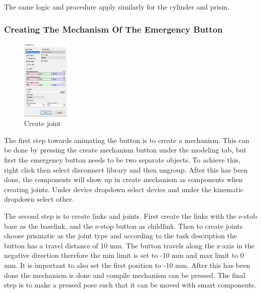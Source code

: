 \documentclass[a4paper,12pt]{article}
\begin{document}
The same logic and procedure apply similarly for the cylinder and prism.

\subsubsection{Creating The Mechanism Of The Emergency Button}
\begin{figure}
  \label{fig:create_joint}
  \centering
  \includegraphics[width=0.2\textwidth]{create_joint.png}
  \caption{Create joint}
\end{figure}
The first step towards animating the button is to create a mechanism. This can be done by pressing the create mechanism button under the modeling tab, but first the emergency button needs to be two separate objects. To achieve this, right click then select disconnect library and then ungroup. After this has been done, the components will show up in create mechanism as components when creating joints. Under device dropdown select device and under the kinematic dropdown select other.

The second step is to create links and joints. First create the links with the e-stob base as the baselink, and the e-stop button as childlink. Then to create joints choose prismatic as the joint type and according to the task description the button has a travel distance of 10 mm. The button travels along the z-axis in the negative direction therefore the min limit is set to -10 mm and max limit to 0 mm. It is important to also set the first position to -10 mm. After this has been done the mechanism is done and compile mechanism can be pressed. The final step is to make a pressed pose such that it can be moved with smart components.
\end{document}
